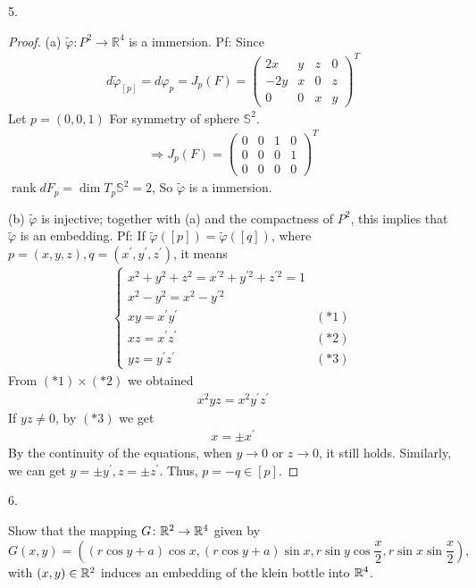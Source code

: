 5.
\begin{proof}
    (a) $\tilde{\varphi}: P^2 \rightarrow \mathbb{R}^4$ is a immersion.
Pf: Since
\begin{align*}
d \tilde{\varphi}_{[p]}=d \varphi_p=J_p(F)=\left(\begin{array}{rrrr}
2 x & y & z & 0 \\
-2 y & x & 0 & z \\
0 & 0 & x & y
\end{array}\right)^T
\end{align*}
Let $p=(0,0,1)$ For symmetry of sphere $\mathbb{S}^2$.
\begin{align*}
\Rightarrow J_p(F)=\left(\begin{array}{llll}
0 & 0 & 1 & 0 \\
0 & 0 & 0 & 1 \\
0 & 0 & 0 & 0
\end{array}\right)^T
\end{align*}
$\operatorname{rank} d F_p=\operatorname{dim} T_p \mathbb{S}^2=2$, So $\tilde{\varphi}$ is a immersion.

(b) $\tilde{\varphi}$ is injective; together with (a) and the compactness of $P^2$, this implies that $\tilde{\varphi}$ is an embedding.
Pf: If $\tilde{\varphi}([p])=\tilde{\varphi}([q])$, where $p=(x, y, z), q=\left(x^{\prime}, y^{\prime}, z^{\prime}\right)$, it means
\begin{align*}
\begin{cases}x^2+y^2+z^2=x^{\prime 2}+y^{\prime 2}+z^{\prime 2}=1 \\ x^2-y^2=x^2-y^{\prime 2} \\ x y=x^{\prime} y^{\prime} & (* 1) \\ x z=x^{\prime} z^{\prime} & (* 2) \\ y z=y^{\prime} z^{\prime} & (* 3)\end{cases}
\end{align*}
From $(* 1) \times(* 2)$ we obtained
\begin{align*}
x^2 y z=x^2 y^{\prime} z^{\prime}
\end{align*}
If $y z \neq 0$, by $(* 3)$ we get
\begin{align*}
x= \pm x^{\prime}
\end{align*}
By the continuity of the equations, when $y \rightarrow 0$ or $z \rightarrow 0$, it still holds.
Similarly, we can get $y= \pm y^{\prime}, z= \pm z^{\prime}$. Thus, $p=-q \in[p]$.
\end{proof}

6.
\begin{Exercise}
    Show that the mapping $G\colon {\mathbb R}^2\to{\mathbb R}^4$ given by 
    \[G(x,y)=((r\cos y+a)\cos x,(r\cos y+a)\sin x, r\sin y\cos \frac{x}{2},r\sin x\sin \frac{x}{2}), \]
    with $(x,y)\in{\mathbb R}^2$ induces an embedding of the klein bottle into ${\mathbb R}^4$.
\end{Exercise}

